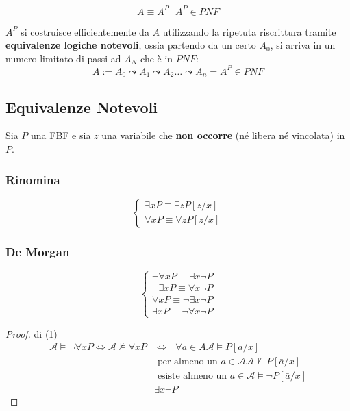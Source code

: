 $$
A \equiv A^P ~~~ A^P \in PNF
$$

$A^P$ si costruisce efficientemente da $A$ utilizzando la ripetuta riscrittura tramite 
\textbf{equivalenze logiche notevoli}, ossia partendo da un certo 
$A_0$, si arriva in un numero limitato di passi ad $A_N$ che è in $PNF$: 
$$
A := A_0 \leadsto A_1 \leadsto A_2 \ldots \leadsto A_n = A^P \in PNF
$$

\subsection{Equivalenze Notevoli}
Sia $P$ una FBF e sia $z$ una variabile che \textbf{non occorre} (né libera 
né vincolata) in $P$. 

\subsubsection{Rinomina}
\[
        \begin{cases}
                \exists x P \equiv \exists z P[z/x] \\
                \forall x P \equiv \forall z P[z/x]
        \end{cases}
\]
\subsubsection{De Morgan}
\[
        \begin{cases}
                \neg \forall x P \equiv \exists x \neg P \\
                \neg \exists x P \equiv \forall x \neg P \\
                \forall x P \equiv \neg \exists x \neg P \\
                \exists x P \equiv \neg \forall x \neg P
        \end{cases}
\]
\begin{proof}{di (1)}
        \begin{align*}
                \mathcal{A} \models \neg \forall x P \iff \mathcal{A} \nvDash \forall x P & \iff \neg \forall a \in A \mathcal{A}\models P[\bar{a}/x] \\
                                                                                          & \text{ per almeno un } a \in \mathcal{A} \mathcal{A} \nvDash P[\bar{a}/x] \\
                                                                                          & \text{ esiste almeno un } a \in \mathcal{A} \models \neg P[\bar{a}/x] \\
                                                                                          & \exists x \neg P 
        \end{align*}
\end{proof}

